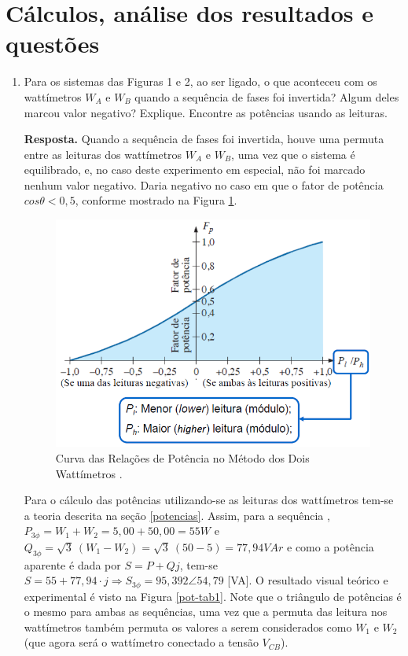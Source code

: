 \documentclass[a4paper,12pt,oneside,openany,table,xcdraw]{article}
\begin{document}
\section{Cálculos, análise dos resultados e questões} %
\begin{enumerate}[1)]
\item Para os sistemas das Figuras 1 e 2, ao ser ligado, o que aconteceu com os wattímetros $W_A$ e $W_B$ quando a sequência de fases foi invertida? Algum deles marcou valor negativo? Explique. Encontre as potências usando as leituras. 

\vspace{0.8mm}
\textbf{Resposta.} Quando  a sequência de fases foi invertida, houve uma permuta entre as leituras dos wattímetros $W_A$ e $W_B$, uma vez que o sistema é equilibrado, e, no caso deste experimento em especial, não foi marcado nenhum valor negativo. Daria negativo no caso em que o fator de potência $cos \theta <0,5$, conforme mostrado na Figura \ref{fp}.
\begin{figure}[H]
\centering
\captionsetup{font=scriptsize}
\includegraphics[width=13cm]{fp}
\caption{Curva das Relações de Potência no Método dos Dois Wattímetros \cite{ph}.}
\label{fp}
\end{figure}

Para o cálculo das potências utilizando-se as leituras dos wattímetros tem-se a teoria descrita na seção \ref{potencias}. Assim, para a sequência , $P_{3\phi}=W_1+W_2 = 5,00 + 50,00 = 55 W$ e $Q_{3\phi} = \sqrt{3}\ (W_1 - W_2) = \sqrt{3}\ (50 - 5) = 77,94 VAr$ e como a potência aparente é dada por $S=P+Qj$, tem-se $S= 55 + 77,94\cdot j \Rightarrow S_{3\phi} = 95,392\angle 54,79$ [VA]. O resultado visual teórico e experimental é visto na Figura \ref{pot-tab1}. Note que o triângulo de potências é o mesmo para ambas as sequências, uma vez que a permuta das leitura nos wattímetros também permuta os valores a serem considerados como $W_1$ e $W_2$ (que agora será o wattímetro conectado a tensão $V_{CB}$). 


\end{enumerate}
\end{document}
